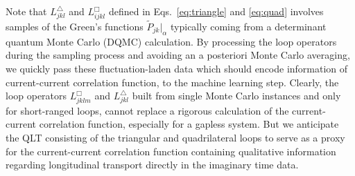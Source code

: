 \documentclass[amsmath,amssymb, aps, prx, longbibliography, twocolumn]{revtex4-1}
\begin{document}
Note that  $L^\triangle_{jkl}$ and  $L^\Box_{ijkl}$ defined in Eqs.~\eqref{eq:triangle} and \eqref{eq:quad} involves samples of the Green's functions $\widetilde{P}_{jk}|_{\alpha}$ typically coming from a determinant quantum Monte Carlo (DQMC) calculation. 
By processing the loop operators during the sampling process and avoiding an a posteriori Monte Carlo averaging, we quickly pass these fluctuation-laden data which should encode information of current-current correlation function, to the machine learning step. 
Clearly, the loop operators $L^\Box_{jklm}$ and $ L^\triangle_{jkl}$ built from single Monte Carlo instances and only for short-ranged loops, cannot replace a rigorous calculation of the current-current correlation function, especially for a gapless system. But we anticipate the QLT consisting of the triangular and quadrilateral loops to serve as a  proxy for the current-current correlation function containing qualitative information regarding longitudinal transport directly in the imaginary time data.  



\end{document}
